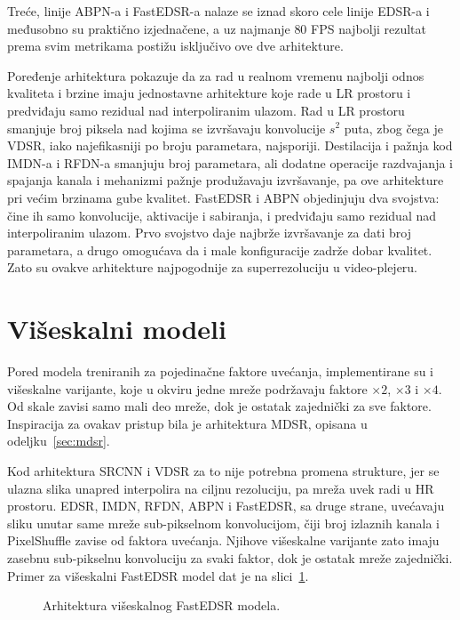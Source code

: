 \documentclass[12pt,a4paper]{article}
\begin{document}
Treće, linije ABPN-a i FastEDSR-a nalaze se iznad skoro cele linije EDSR-a i međusobno su praktično izjednačene, a uz najmanje $80$ FPS najbolji rezultat prema svim metrikama postižu isključivo ove dve arhitekture.

Poređenje arhitektura pokazuje da za rad u realnom vremenu najbolji odnos kvaliteta i brzine imaju jednostavne arhitekture koje rade u LR prostoru i predviđaju samo rezidual nad interpoliranim ulazom. Rad u LR prostoru smanjuje broj piksela nad kojima se izvršavaju konvolucije $s^2$ puta, zbog čega je VDSR, iako najefikasniji po broju parametara, najsporiji. Destilacija i pažnja kod IMDN-a i RFDN-a smanjuju broj parametara, ali dodatne operacije razdvajanja i spajanja kanala i mehanizmi pažnje produžavaju izvršavanje, pa ove arhitekture pri većim brzinama gube kvalitet. FastEDSR i ABPN objedinjuju dva svojstva: čine ih samo konvolucije, aktivacije i sabiranja, i predviđaju samo rezidual nad interpoliranim ulazom. Prvo svojstvo daje najbrže izvršavanje za dati broj parametara, a drugo omogućava da i male konfiguracije zadrže dobar kvalitet. Zato su ovakve arhitekture najpogodnije za superrezoluciju u video-plejeru.

\section{Višeskalni modeli}
\label{sec:viseskalni}

Pored modela treniranih za pojedinačne faktore uvećanja, implementirane su i višeskalne varijante, koje u okviru jedne mreže podržavaju faktore $\times2$, $\times3$ i $\times4$. Od skale zavisi samo mali deo mreže, dok je ostatak zajednički za sve faktore. Inspiracija za ovakav pristup bila je arhitektura MDSR, opisana u odeljku~\ref{sec:mdsr}.

Kod arhitektura SRCNN i VDSR za to nije potrebna promena strukture, jer se ulazna slika unapred interpolira na ciljnu rezoluciju, pa mreža uvek radi u HR prostoru. EDSR, IMDN, RFDN, ABPN i FastEDSR, sa druge strane, uvećavaju sliku unutar same mreže sub-pikselnom konvolucijom, čiji broj izlaznih kanala i PixelShuffle zavise od faktora uvećanja. Njihove višeskalne varijante zato imaju zasebnu sub-pikselnu konvoluciju za svaki faktor, dok je ostatak mreže zajednički. Primer za višeskalni FastEDSR model dat je na slici~\ref{fig:diagram_FastEDSR_Multiscale}.

\begin{figure}[H]
	\centering
	\resizebox{0.9\textwidth}{!}{}
	\caption{Arhitektura višeskalnog FastEDSR modela.}
	\label{fig:diagram_FastEDSR_Multiscale}
\end{figure}
\end{document}
